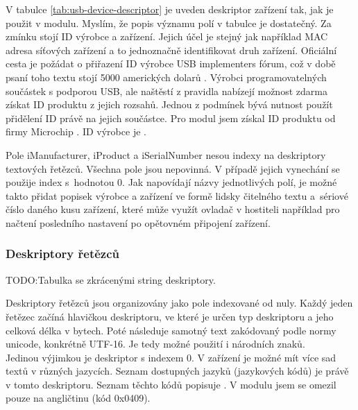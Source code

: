 V tabulce \ref{tab:usb-device-descriptor} je uveden deskriptor zařízení tak, jak je použit v modulu. Myslím, že popis významu  polí v tabulce je dostatečný.  Za zmínku stojí ID výrobce a zařízení. Jejich účel je stejný jak například MAC adresa síťových zařízení a to jednoznačně identifikovat druh zařízení. Oficiální cesta je požádat o přiřazení ID výrobce USB implementers fórum, což v době psaní toho textu stojí 5000 amerických dolarů \cite{usb-vid}. Výrobci programovatelných součástek s podporou USB, ale naštěstí z pravidla nabízejí možnost zdarma získat ID produktu z jejich rozsahů. Jednou z podmínek bývá nutnost použít přidělení ID  právě na jejich součástce. Pro modul jsem získal ID produktu od firmy Microchip \PID. ID výrobce je \VID.

Pole iManufacturer, iProduct a iSerialNumber nesou indexy na deskriptory textových řetězců. Všechna pole jsou nepovinná. V případě jejich vynechání se použije index s~hodnotou 0. Jak napovídají názvy jednotlivých polí, je možné takto přidat popisek výrobce a zařízení ve formě lidsky čitelného textu a~sériové číslo daného kusu zařízení, které může využít ovladač v hostiteli například pro načtení posledního nastavení po opětovném připojení zařízení.

\subsubsection{Deskriptory řetězců}
TODO:Tabulka se zkrácenými string deskriptory.

Deskriptory řetězců jsou organizovány jako pole indexované od nuly. Každý jeden řetězec začíná hlavičkou deskriptoru, ve které je určen typ deskriptoru a jeho celková délka v bytech. Poté následuje samotný text zakódovaný podle normy unicode, konkrétně UTF-16. Je tedy možné použití i národních znaků.\\
Jedinou výjimkou je deskriptor s indexem 0. V zařízení je možné mít více sad textů v různých jazycích. Seznam dostupných jazyků (jazykových kódů) je právě v tomto deskriptoru. Seznam těchto kódů popisuje \cite{usb-lang}. V modulu jsem se omezil pouze na angličtinu (kód 0x0409).

